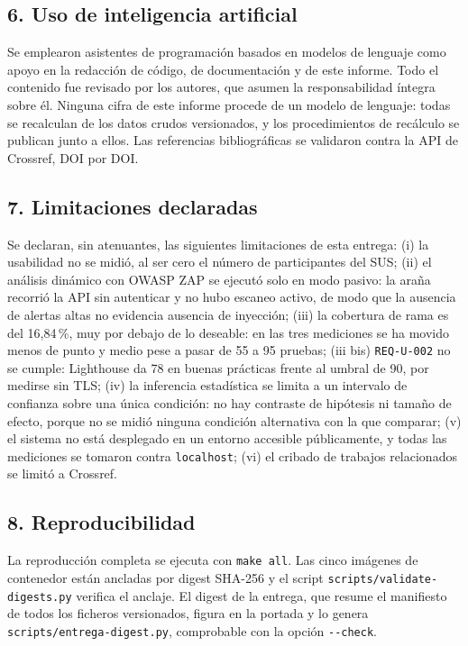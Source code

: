 \documentclass[11pt,a4paper]{article}
\newcommand{\req}[1]{\texttt{#1}}
\begin{document}
\subsection*{6. Uso de inteligencia artificial}
Se emplearon asistentes de programación basados en modelos de lenguaje como
apoyo en la redacción de código, de documentación y de este informe. Todo el
contenido fue revisado por los autores, que asumen la responsabilidad íntegra
sobre él. Ninguna cifra de este informe procede de un modelo de lenguaje: todas
se recalculan de los datos crudos versionados, y los procedimientos de recálculo
se publican junto a ellos. Las referencias bibliográficas se validaron contra la
API de Crossref, DOI por DOI.

\subsection*{7. Limitaciones declaradas}
Se declaran, sin atenuantes, las siguientes limitaciones de esta entrega:
(i) la usabilidad no se midió, al ser cero el número de participantes del SUS;
(ii) el análisis dinámico con OWASP ZAP se ejecutó solo en modo pasivo: la araña recorrió la API sin autenticar y no hubo escaneo activo, de modo que la ausencia de alertas altas no evidencia ausencia de inyección;
(iii) la cobertura de rama es del 16,84\,\%, muy por debajo de lo deseable: en las tres mediciones se ha movido menos de punto y medio pese a pasar de 55 a 95 pruebas;
(iii bis) \req{REQ-U-002} no se cumple: Lighthouse da 78 en buenas prácticas
frente al umbral de 90, por medirse sin TLS;
(iv) la inferencia estadística se limita a un intervalo de confianza sobre una
única condición: no hay contraste de hipótesis ni tamaño de efecto, porque no se
midió ninguna condición alternativa con la que comparar;
(v) el sistema no está desplegado en un entorno accesible públicamente, y
todas las mediciones se tomaron contra \texttt{localhost};
(vi) el cribado de trabajos relacionados se limitó a Crossref.

\subsection*{8. Reproducibilidad}
La reproducción completa se ejecuta con \texttt{make all}. Las cinco imágenes de
contenedor están ancladas por digest SHA-256 y el script
\texttt{scripts\-/validate-digests.py} verifica el anclaje. El digest de la
entrega, que resume el manifiesto de todos los ficheros versionados, figura en
la portada y lo genera \texttt{scripts\-/entrega-digest.py}, comprobable con la
opción \texttt{-{}-check}.
\end{document}
